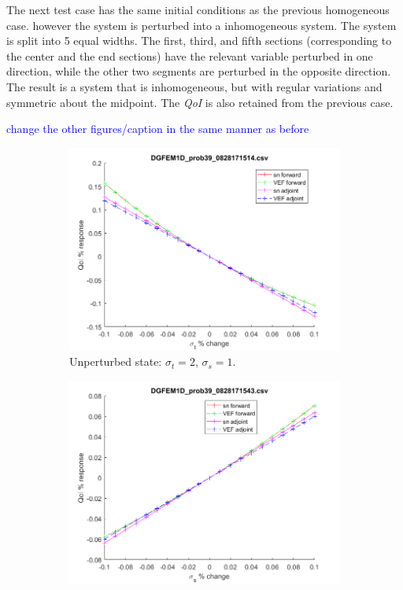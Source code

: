 \documentclass[12pt]{report}
\newcommand{\sigt}{\sigma_t}
\newcommand{\sigs}{\sigma_s}
\newcommand{\qoi}{{\it QoI}\xspace}
\newcommand{\comment}[2]{\marginpar{\textcolor{#2}{$\star$}}\textcolor{#2}{#1}\newline}
\newcommand{\jcr}[1]{\comment{#1}{blue}}
\newcommand{\jcr}[1]{\phantom{a}}
\begin{document}
The next test case has the same initial conditions as the previous homogeneous case. however the system is perturbed into a inhomogeneous system. The system is split into 5 equal widths. The first, third, and fifth sections (corresponding to the center and the end sections) have the relevant variable perturbed in one direction, while the other two segments are perturbed in the opposite direction. The result is a system that is inhomogeneous, but with regular variations and symmetric about the midpoint. The \qoi is also retained from the previous case.

\jcr{change the other figures/caption in the same manner as before}

\begin{figure}[H]
\label{InHomoPertt}
\centering
\begin{subfigure}{.5\textwidth}
  \centering
  \includegraphics[width=.98\linewidth]{figures/39sigtSens.png}
  \caption{Unperturbed state: $\sigt=2$, $\sigs=1$.}
  \label{fig:sfig1}
\end{subfigure}%
\begin{subfigure}{.5\textwidth}
  \centering
  \includegraphics[width=.98\linewidth]{figures/39sigsSens.png}

\end{subfigure}
\end{figure}
\end{document}
